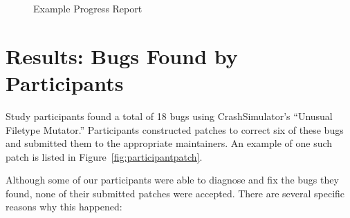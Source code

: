\begin{figure}[btp]
\centering
{}
\caption[Example Progress Report]{Example Progress Report}
\label{fig:examplereport}
\end{figure}
\restoregeometry

\section{Results: Bugs Found by Participants}
\label{subsec:bugs-by-participants}
Study participants found a total of 18 bugs using CrashSimulator's
``Unusual Filetype Mutator.''
Participants constructed patches to correct six of these bugs and submitted
them to the appropriate maintainers.
An example of one such patch is listed in Figure~\ref{fig:participantpatch}.

Although some of our participants were able to diagnose and fix the bugs they found,
none of their submitted patches were accepted.
There are several specific reasons why this happened:

